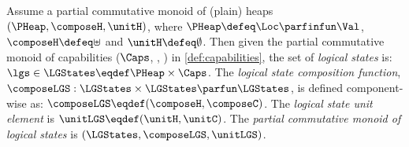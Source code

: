 \begin{definition}
\label{def:logical_states}
Assume a partial commutative monoid of (plain) heaps \( (\PHeap, \composeH, \unitH) \), where \(\PHeap \defeq \Loc \parfinfun \Val \), \( \composeH \defeq \uplus \) and \( \unitH \defeq \emptyset \).
Then given the partial commutative monoid of capabilities ($\Caps$, \composeC, \unitC) in \ref{def:capabilities}, the set of \emph{logical states} is: \(\lgs \in \LGStates \eqdef \PHeap \times \Caps\).
The \emph{logical state composition function}, $\composeLGS: \LGStates \times \LGStates \parfun \LGStates$, is defined component-wise as: $\composeLGS \eqdef (\composeH, \composeC)$.
The \emph{logical state unit element} is $\unitLGS \eqdef (\unitH, \unitC)$.
The \emph{partial commutative monoid of logical states} is $(\LGStates, \composeLGS, \unitLGS)$.
\end{definition}

